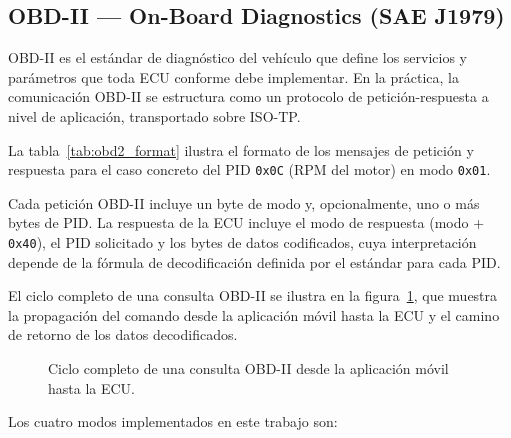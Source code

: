 \subsection{OBD-II — On-Board Diagnostics (SAE J1979)}
\label{sec:proto_obd2}

OBD-II es el estándar de diagnóstico del vehículo que define los servicios y parámetros que toda ECU conforme debe implementar. En la práctica, la comunicación OBD-II se estructura como un protocolo de petición-respuesta a nivel de aplicación, transportado sobre ISO-TP.

La tabla~\ref{tab:obd2_format} ilustra el formato de los mensajes de petición y respuesta para el caso concreto del PID \texttt{0x0C} (RPM del motor) en modo \texttt{0x01}.

% 

Cada petición OBD-II incluye un byte de modo y, opcionalmente, uno o más bytes de PID. La respuesta de la ECU incluye el modo de respuesta (modo + \texttt{0x40}), el PID solicitado y los bytes de datos codificados, cuya interpretación depende de la fórmula de decodificación definida por el estándar para cada PID.

El ciclo completo de una consulta OBD-II se ilustra en la figura~\ref{fig:obd2_cycle}, que muestra la propagación del comando desde la aplicación móvil hasta la ECU y el camino de retorno de los datos decodificados.

\begin{figure}[!htbp]
\centering
\caption{Ciclo completo de una consulta OBD-II desde la aplicación móvil hasta la ECU.}
\label{fig:obd2_cycle}
\end{figure}

Los cuatro modos implementados en este trabajo son:

